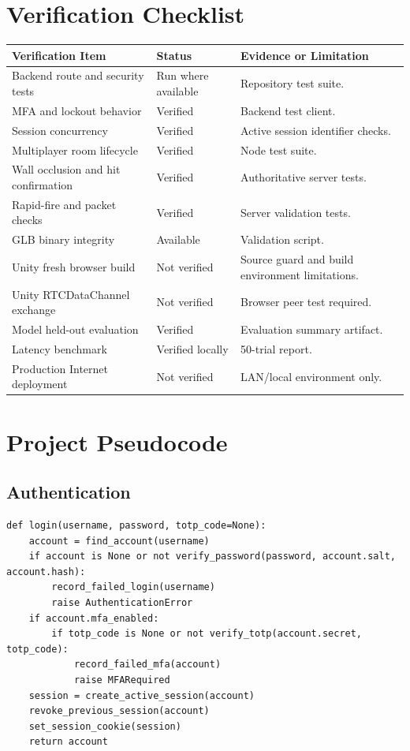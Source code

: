 \documentclass[12pt,a4paper,oneside]{report}
\begin{document}
\chapter{Verification Checklist}
\begin{longtable}{p{58mm}p{35mm}p{64mm}}
\toprule
Verification Item & Status & Evidence or Limitation\\
\midrule
Backend route and security tests & Run where available & Repository test suite.\\
MFA and lockout behavior & Verified & Backend test client.\\
Session concurrency & Verified & Active session identifier checks.\\
Multiplayer room lifecycle & Verified & Node test suite.\\
Wall occlusion and hit confirmation & Verified & Authoritative server tests.\\
Rapid-fire and packet checks & Verified & Server validation tests.\\
GLB binary integrity & Available & Validation script.\\
Unity fresh browser build & Not verified & Source guard and build environment limitations.\\
Unity RTCDataChannel exchange & Not verified & Browser peer test required.\\
Model held-out evaluation & Verified & Evaluation summary artifact.\\
Latency benchmark & Verified locally & 50-trial report.\\
Production Internet deployment & Not verified & LAN/local environment only.\\
\bottomrule
\end{longtable}

\chapter{Project Pseudocode}
\section{Authentication}
\begin{verbatim}
def login(username, password, totp_code=None):
    account = find_account(username)
    if account is None or not verify_password(password, account.salt, account.hash):
        record_failed_login(username)
        raise AuthenticationError
    if account.mfa_enabled:
        if totp_code is None or not verify_totp(account.secret, totp_code):
            record_failed_mfa(account)
            raise MFARequired
    session = create_active_session(account)
    revoke_previous_session(account)
    set_session_cookie(session)
    return account
\end{verbatim}
\end{document}

